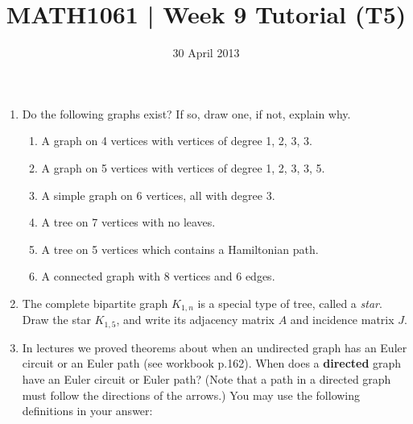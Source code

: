 \documentclass[a4paper,12pt]{article}
\begin{document}
\pagestyle{myheadings}

\title{MATH1061 | Week 9 Tutorial (T5)}
\date{30 April 2013}
\maketitle

\begin{enumerate}
\item
Do the following graphs exist? If so, draw one, if not,
explain why.
    \begin{enumerate}
    \item A graph on 4 vertices with vertices of degree 1, 2, 3, 3.
    \item A graph on 5 vertices with vertices of degree 1, 2, 3, 3, 5.
    \item A simple graph on 6 vertices, all with degree 3.
    \item A tree on 7 vertices with no leaves.
    \item A tree on 5 vertices which contains a Hamiltonian path.
    \item A connected graph with 8 vertices and 6 edges.
    \end{enumerate}
\item
The complete bipartite graph $K_{1,n}$ is a special type of tree, called a
{\em star}. Draw the star $K_{1,5}$, and write its adjacency matrix $A$ and
incidence matrix $J$.
\item
In lectures we proved theorems about when an undirected graph has an Euler
circuit or an Euler path (see workbook p.162).
When does a {\bf directed} graph have an Euler circuit or Euler path? (Note that
a path in a directed graph must follow the directions of the arrows.) You may
use the following definitions in your answer:



\end{enumerate}
\end{document}

